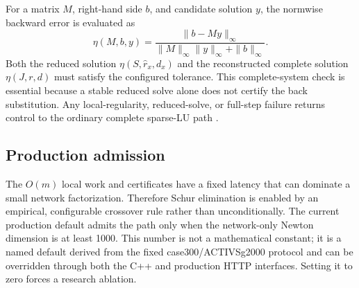 For a matrix $M$, right-hand side $b$, and candidate solution $y$, the
normwise backward error is evaluated as
\begin{equation}
 \eta(M,b,y)=
 \frac{\|b-My\|_{\infty}}
 {\|M\|_{\infty}\|y\|_{\infty}+\|b\|_{\infty}}.
 \label{eq:backward-error}
\end{equation}
Both the reduced solution
$\eta(S,\widehat r_x,d_x)$ and the reconstructed complete solution
$\eta(J,r,d)$ must satisfy the configured tolerance. This complete-system
check is essential because a stable reduced solve alone does not certify the
back substitution. Any local-regularity, reduced-solve, or full-step failure
returns control to the ordinary complete sparse-LU path
\cite{higham2002accuracy}.

\subsection{Production admission}

The $O(m)$ local work and certificates have a fixed latency that can dominate
a small network factorization. Therefore Schur elimination is enabled by an
empirical, configurable crossover rule rather than unconditionally. The
current production default admits the path only when the network-only Newton
dimension is at least 1000. This number is not a mathematical constant; it is a
named default derived from the fixed case300/ACTIVSg2000 protocol and can be
overridden through both the C++ and production HTTP interfaces. Setting it to
zero forces a research ablation.

